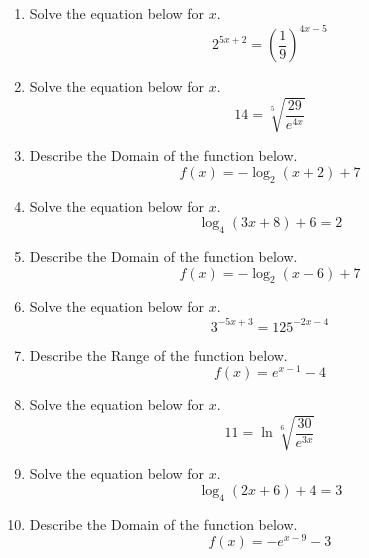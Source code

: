 \documentclass[14pt]{extbook}
\begin{document}
\begin{enumerate}
\item{
Solve the equation below for $x$.\[ 2^{5x+2} = \left(\frac{1}{9}\right)^{4x-5} \]} \newpage
\item{
Solve the equation below for $x$.\[  14 = \sqrt[5]{\frac{29}{e^{4x}}} \]} \newpage
\item{
Describe the Domain of the function below.\[ f(x) = -\log_2{(x+2)}+7 \]} \newpage
\item{
Solve the equation below for $x$.\[ \log_{4}{(3x+8)}+6 = 2 \]} \newpage
\item{
Describe the Domain of the function below.\[ f(x) = -\log_2{(x-6)}+7 \]} \newpage
\item{
Solve the equation below for $x$.\[ 3^{-5x+3} = 125^{-2x-4} \]} \newpage
\item{
Describe the Range of the function below.\[ f(x) = e^{x-1}-4 \]} \newpage
\item{
Solve the equation below for $x$.\[  11 = \ln{\sqrt[6]{\frac{30}{e^{3x}}}} \]} \newpage
\item{
Solve the equation below for $x$.\[ \log_{4}{(2x+6)}+4 = 3 \]} \newpage
\item{
Describe the Domain of the function below.\[ f(x) = -e^{x-9}-3 \]} \newpage
\end{enumerate}
\end{document}
